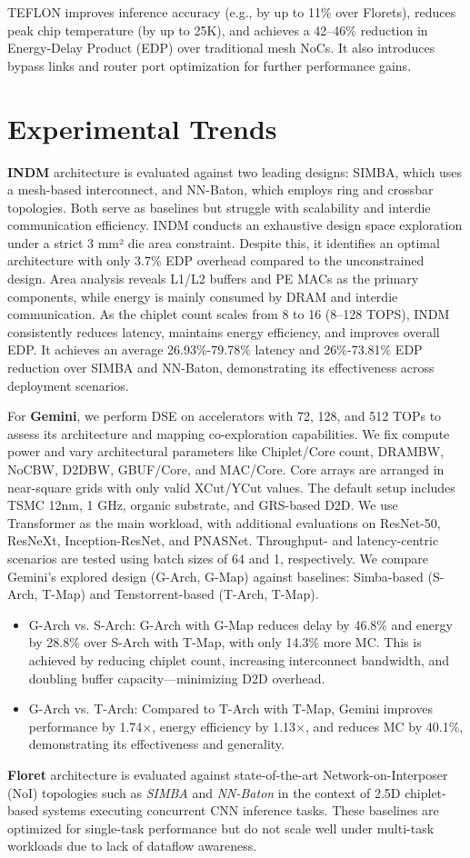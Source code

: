 \documentclass[acmsmall]{acmart}
\begin{document}
TEFLON improves inference accuracy (e.g., by up to 11\% over Florets), reduces peak chip temperature (by up to 25K), and achieves a 42--46\% reduction in Energy-Delay Product (EDP) over traditional mesh NoCs. It also introduces bypass links and router port optimization for further performance gains.


\section{Experimental Trends}
\textbf{INDM} architecture is evaluated against two leading designs: SIMBA, which uses a mesh-based interconnect, and NN-Baton, which employs ring and crossbar topologies. Both serve as baselines but struggle with scalability and interdie communication efficiency.
INDM conducts an exhaustive design space exploration under a strict 3 mm² die area constraint. Despite this, it identifies an optimal architecture with only 3.7\% EDP overhead compared to the unconstrained design. Area analysis reveals L1/L2 buffers and PE MACs as the primary components, while energy is mainly consumed by DRAM and interdie communication. As the chiplet count scales from 8 to 16 (8–128 TOPS), INDM consistently reduces latency, maintains energy efficiency, and improves overall EDP. It achieves an average 26.93\%-79.78\% latency and 26\%-73.81\% EDP reduction over SIMBA and NN-Baton, demonstrating its effectiveness across deployment scenarios.

For \textbf{Gemini}, we perform DSE on accelerators with 72, 128, and 512 TOPs to assess its architecture and mapping co-exploration capabilities. We fix compute power and vary architectural parameters like Chiplet/Core count, DRAMBW, NoCBW, D2DBW, GBUF/Core, and MAC/Core. Core arrays are arranged in near-square grids with only valid XCut/YCut values. The default setup includes TSMC 12nm, 1 GHz, organic substrate, and GRS-based D2D. We use Transformer as the main workload, with additional evaluations on ResNet-50, ResNeXt, Inception-ResNet, and PNASNet. Throughput- and latency-centric scenarios are tested using batch sizes of 64 and 1, respectively. We compare Gemini’s explored design (G-Arch, G-Map) against baselines: Simba-based (S-Arch, T-Map) and Tenstorrent-based (T-Arch, T-Map).
\begin{itemize}
  \item G-Arch vs. S-Arch: G-Arch with G-Map reduces delay by 46.8\% and energy by 28.8\% over S-Arch with T-Map, with only 14.3\% more MC. This is achieved by reducing chiplet count, increasing interconnect bandwidth, and doubling buffer capacity—minimizing D2D overhead.
  \item G-Arch vs. T-Arch: Compared to T-Arch with T-Map, Gemini improves performance by 1.74×, energy efficiency by 1.13×, and reduces MC by 40.1\%, demonstrating its effectiveness and generality.
\end{itemize}
\textbf{Floret} architecture is evaluated against state-of-the-art Network-on-Interposer (NoI) topologies such as \textit{SIMBA} and \textit{NN-Baton} in the context of 2.5D chiplet-based systems executing concurrent CNN inference tasks. These baselines are optimized for single-task performance but do not scale well under multi-task workloads due to lack of dataflow awareness. 
\end{document}
